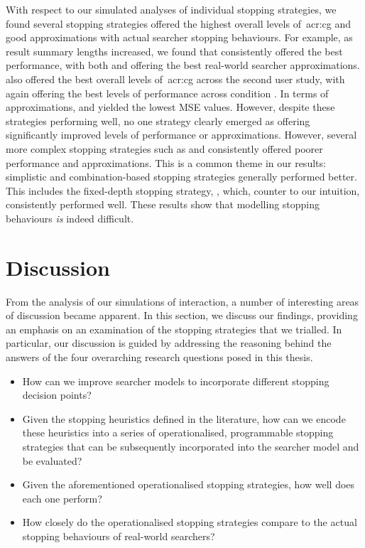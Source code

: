 With respect to our simulated analyses of individual stopping strategies, we found several stopping strategies offered the highest overall levels of~\gls{acr:cg} and good approximations with actual searcher stopping behaviours. For example, as result summary lengths increased, we found that  consistently offered the best performance, with both  and  offering the best real-world searcher approximations.  also offered the best overall levels of~\gls{acr:cg} across the second user study, with  again offering the best levels of performance across condition . In terms of approximations,  and  yielded the lowest MSE values. However, despite these strategies performing well, no one strategy clearly emerged as offering significantly improved levels of performance or approximations. However, several more complex stopping strategies such as  and  consistently offered poorer performance and approximations. This is a common theme in our results: simplistic and combination-based stopping strategies generally performed better. This includes the fixed-depth stopping strategy, , which, counter to our intuition, consistently performed well. These results show that modelling stopping behaviours \emph{is} indeed difficult.

\section{Discussion}\label{sec:conclusions:discussion}
From the analysis of our simulations of interaction, a number of interesting areas of discussion became apparent. In this section, we discuss our findings, providing an emphasis on an examination of the stopping strategies that we trialled. In particular, our discussion is guided by addressing the reasoning behind the answers of the four overarching research questions posed in this thesis.

\begin{itemize}
    \item{ How can we improve searcher models to incorporate different stopping decision points?}
    \item{ Given the stopping heuristics defined in the literature, how can we encode these heuristics into a series of operationalised, programmable stopping strategies that can be subsequently incorporated into the searcher model and be evaluated?}
    \item{ Given the aforementioned operationalised stopping strategies, how well does each one perform?}
    \item{ How closely do the operationalised stopping strategies compare to the actual stopping behaviours of real-world searchers?}
    
\end{itemize}

